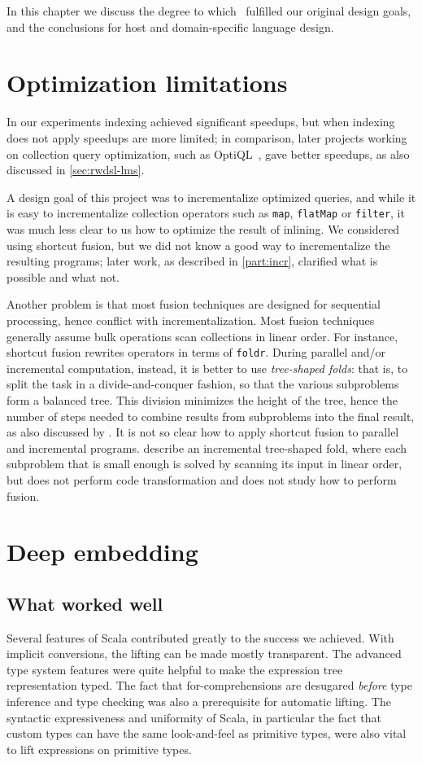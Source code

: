 In this chapter we discuss the degree to which \LoS\ fulfilled our original design goals, and the conclusions
for host and domain-specific language design.

\section{Optimization limitations}
\label{sec:optim-vs-inc}
In our experiments indexing achieved significant speedups, but when indexing
does not apply speedups are more limited; in comparison, later projects working
on collection query optimization, such as OptiQL~\citep{Rompf13,Arvind13}, gave
better speedups, as also discussed in \cref{sec:rwdsl-lms}.

A design goal of this project was to incrementalize optimized queries, and while
it is easy to incrementalize collection operators such as \texttt{map},
\texttt{flatMap} or \texttt{filter}, it was much less clear to us how to
optimize the result of inlining.
We considered using shortcut fusion, but we did
not know a good way to incrementalize the resulting programs; later work, as
described in \cref{part:incr}, clarified what is possible and what not.

Another problem is that most fusion techniques are designed for sequential
processing, hence conflict with incrementalization.
Most fusion techniques generally assume bulk operations scan collections in
linear order. For instance, shortcut fusion rewrites operators in terms of
\texttt{foldr}.
During parallel and/or incremental computation, instead, it is better to use
\emph{tree-shaped folds}: that is, to split the task in a divide-and-conquer
fashion, so that the various subproblems form a balanced tree. This division
minimizes the height of the tree, hence the number of steps needed to combine
results from subproblems into the final result, as also discussed by
\citet{Steele2009organizing}. It is not so clear how to apply shortcut fusion to
parallel and incremental programs.
\citet{Maier2013} describe an incremental tree-shaped fold, where each
subproblem that is small enough is solved by scanning its input in linear order,
but does not perform code transformation and does not study how to perform fusion.

\section{Deep embedding}
\subsection{What worked well}
Several features of Scala contributed greatly to the success we achieved. With implicit conversions, the lifting can be made mostly transparent. The advanced type system features were quite helpful to make the expression tree representation typed. The fact that for-comprehensions are desugared \emph{before} type inference and type checking was also a prerequisite for automatic lifting. The syntactic expressiveness and uniformity of Scala, in particular the fact that custom types can have the same look-and-feel as primitive types, were also vital to lift expressions on primitive types.

